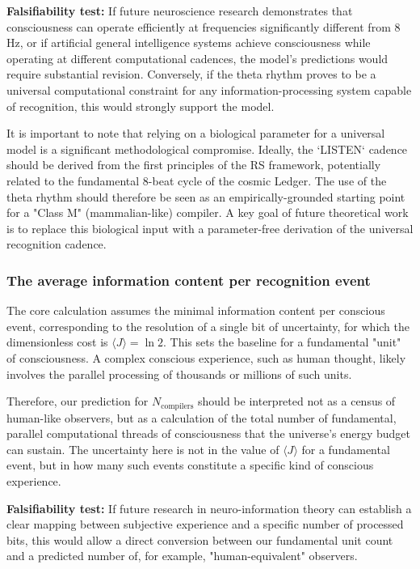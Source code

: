 \documentclass[11pt,a4paper]{article}
\theoremstyle{definition}
\theoremstyle{remark}
\begin{document}
\textbf{Falsifiability test:} If future neuroscience research demonstrates that consciousness can operate efficiently at frequencies significantly different from 8 Hz, or if artificial general intelligence systems achieve consciousness while operating at different computational cadences, the model's predictions would require substantial revision. Conversely, if the theta rhythm proves to be a universal computational constraint for any information-processing system capable of recognition, this would strongly support the model.

It is important to note that relying on a biological parameter for a universal model is a significant methodological compromise. Ideally, the `LISTEN` cadence should be derived from the first principles of the RS framework, potentially related to the fundamental 8-beat cycle of the cosmic Ledger. The use of the theta rhythm should therefore be seen as an empirically-grounded starting point for a "Class M" (mammalian-like) compiler. A key goal of future theoretical work is to replace this biological input with a parameter-free derivation of the universal recognition cadence.

\subsubsection{The average information content per recognition event}

The core calculation assumes the minimal information content per conscious event, corresponding to the resolution of a single bit of uncertainty, for which the dimensionless cost is \(\langle J \rangle = \ln 2\). This sets the baseline for a fundamental "unit" of consciousness. A complex conscious experience, such as human thought, likely involves the parallel processing of thousands or millions of such units.

Therefore, our prediction for \(N_{\text{compilers}}\) should be interpreted not as a census of human-like observers, but as a calculation of the total number of fundamental, parallel computational threads of consciousness that the universe's energy budget can sustain. The uncertainty here is not in the value of \(\langle J \rangle\) for a fundamental event, but in how many such events constitute a specific kind of conscious experience.

\textbf{Falsifiability test:} If future research in neuro-information theory can establish a clear mapping between subjective experience and a specific number of processed bits, this would allow a direct conversion between our fundamental unit count and a predicted number of, for example, "human-equivalent" observers.
\end{document}

